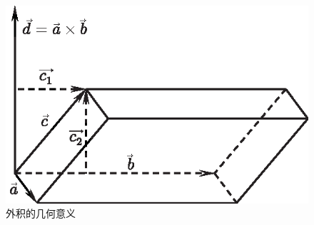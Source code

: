 \begin{enumerate}[1.]
\begin{figure}[h]
\begin{minipage}{0.4\linewidth}
			\includegraphics[width=0.9\linewidth]{picture/C-1/1.2/HHJ.eps}
			\caption{外积的几何意义}
			\label{混合积}
		\end{minipage}
	\end{figure}
\end{enumerate}
